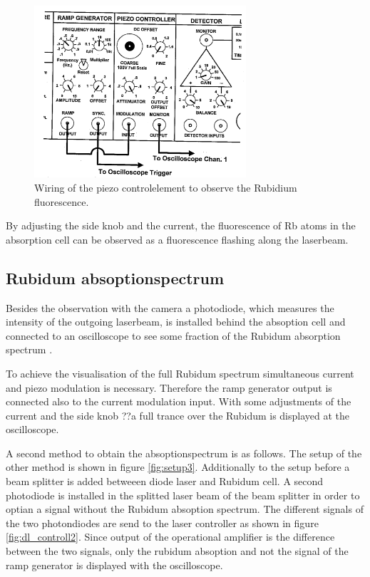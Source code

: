 \begin{figure}
  \centering
  \includegraphics[width=0.7\textwidth]{wiring.png}
  \caption{Wiring of the piezo controlelement to observe the Rubidium fluorescence.\cite{V61}}
  \label{fig:dl_controll}
\end{figure}

By adjusting the side knob and the current,
the fluorescence of Rb atoms in the absorption cell
can be observed
as a fluorescence flashing along the laserbeam.

\subsection{Rubidum absoptionspectrum}
\label{subsec:Rubidum_absoptionspectrum}

Besides the observation with the camera a photodiode,
which measures the intensity
of the outgoing laserbeam,
is installed behind the absoption cell and
connected to an oscilloscope to
see some fraction of the Rubidum absorption spectrum .

To achieve the visualisation of the full Rubidum
spectrum
simultaneous current and piezo modulation
is necessary. Therefore the ramp generator output
is connected also to the current modulation input.
With some adjustments of the current and the side knob
??a full trance over the Rubidum is displayed at the oscilloscope.

A second method to obtain the absoptionspectrum
is as follows.
The setup of the other method is shown in
figure \ref{fig:setup3}.
Additionally to the setup before a beam splitter is added
betweeen diode laser and Rubidum cell.
A second photodiode is installed in the splitted laser beam of the beam splitter
in order to optian a signal without the Rubidum absoption spectrum.
The different signals of the two photondiodes are send to the
laser controller as shown in figure \ref{fig:dl_controll2}.
Since output of the operational amplifier is
the  difference between the two signals,
only the rubidum absoption and not the signal of the ramp generator is
displayed with the oscilloscope.

